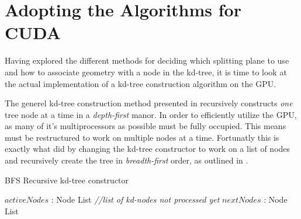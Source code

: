 \section{Adopting the Algorithms for CUDA}\label{sec:kdTreeImpl}


Having explored the different methods for deciding which splitting plane to use
and how to associate geometry with a node in the kd-tree, it is time to look at
the actual implementation of a kd-tree construction algorithm on the GPU.

The generel kd-tree construction method presented in 
recursively constructs \textit{one} tree node at a time in a
\textit{depth-first} manor. In order to efficiently utilize the GPU, as many of
it's multiprocessors as possible must be fully occupied. This means
 must be restructured to work on multiple nodes at a
time. Fortunatly this is exactly what \zhou{} did by changing the kd-tree
constructor to work on a list of nodes and recursively create the tree in
\textit{breadth-first} order, as outlined in .

\begin{algorithm}
  \caption{BFS Recursive kd-tree constructor}
  \label{alg:bfsKDTreeCreator}
  \begin{algorithmic}
              {$activeNodes$ : Node List  \textit{\color{gray}//list of kd-nodes not processed yet}}
              {$nextNodes$ : Node List}
              {
                 \ELSE
                 \ENDIF
               \ENDFOR}
  \end{algorithmic}
\end{algorithm}

